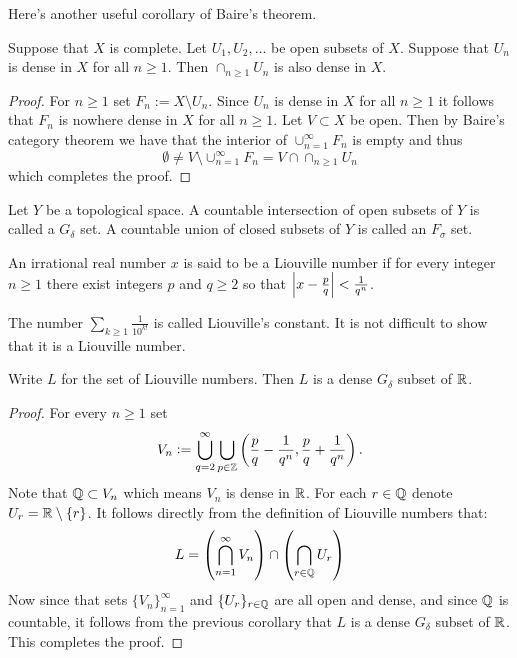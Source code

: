 \documentclass[11pt,a4paper]{article}
\begin{document}
Here's another useful corollary of Baire's theorem.

\begin{corollary}
  Suppose that $X$ is complete. Let $U_1,U_2,\dots$ be open subsets of $X$.
  Suppose that $U_n$ is dense in $X$ for all $n \geq 1$. Then 
  $\cap_{n \geq 1}{U_n}$ is also dense in $X$.
\end{corollary}
\begin{proof}
  For $n \geq 1$ set $F_n := X \setminus U_n$. Since $U_n$ is dense in $X$
  for all $n \geq 1$ it follows that $F_n$ is nowhere dense in $X$ for
  all $n \geq 1$. Let $V \subset X$ be open. Then by Baire's category
  theorem we have that the interior of $\cup_{n=1}^{\infty} F_n$ is
  empty and thus
  \[
    \emptyset \neq 
    V \setminus \cup_{n=1}^{\infty} F_n =
    V \cap \cap_{n \geq 1}{U_n}
  \]
  which completes the proof.
\end{proof}

\begin{definition}
  Let $Y$ be a topological space. A countable intersection of open
  subsets of $Y$ is called a $G_\delta$ set. A countable union of closed 		
  subsets of $Y$ is called an $F_\sigma$ set.
\end{definition}

\begin{definition}
  An irrational real number $x$ is said to be a Liouville number if
  for every integer $n \geq 1$ there exist integers $p$ and $q \geq 2$ 
  so that $\left\lvert x - \frac{p}{q}\right\rvert < \frac{1}{q^n}$.
\end{definition}

\begin{example}
  The number $\sum_{k \geq 1}{\frac{1}{10^{k!}}}$ is called Liouville's 
  constant. It is not difficult to show that it is a Liouville number.
\end{example}

\begin{proposition}
  Write $L$ for the set of Liouville numbers. Then $L$ is a dense
  $G_\delta$ subset of $\mathbb{R}$.
\end{proposition}
\begin{proof}
  For every $n \geq 1$ set
  \[
    V_n := \bigcup_{q=2}^{\infty} \bigcup_{p \in \mathbb{Z}}
    \left(\frac{p}{q} - \frac{1}{q^n},\frac{p}{q} + \frac{1}{q^n}\right).
  \]
  Note that $\mathbb{Q} \subset V_n$ which means $V_n$ is dense in $\mathbb{R}$. For each
  $r \in \mathbb{Q}$ denote $U_r = \mathbb{R} \setminus \{r\}$. It follows directly from
  the definition of Liouville numbers that:
  \[
    L = \left(\bigcap_{n=1}^{\infty}{V_n}\right) \cap
      \left(\bigcap_{r \in \mathbb{Q}}{U_r}\right)
  \]
  Now since that sets $\{V_n\}_{n=1}^{\infty}$ and $\{U_r\}_{r \in \mathbb{Q}}$
  are all open and dense, and since $\mathbb{Q}$ is countable, it follows from
  the previous corollary that $L$ is a dense $G_\delta$ subset of $\mathbb{R}$.
  This completes the proof.
\end{proof}
\end{document}
